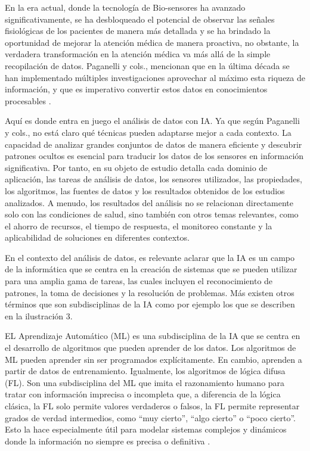 En la era actual, donde la tecnología de Bio-sensores ha avanzado significativamente, se ha desbloqueado el potencial de observar las señales fisiológicas de los pacientes de manera más detallada y se ha brindado la oportunidad de mejorar la atención médica de manera proactiva, no obstante, la verdadera transformación en la atención médica va más allá de la simple recopilación de datos. Paganelli y cols., mencionan que en la última década se han implementado múltiples investigaciones aprovechar al máximo esta riqueza de información, y que es imperativo convertir estos datos en conocimientos procesables \citep{Paganelli2022RealTime}.

Aquí es donde entra en juego el análisis de datos con IA. Ya que según Paganelli y cols., no está claro qué técnicas pueden adaptarse mejor a cada contexto. La capacidad de analizar grandes conjuntos de datos de manera eficiente y descubrir patrones ocultos es esencial para traducir los datos de los sensores en información significativa. Por tanto, en su objeto de estudio detalla cada dominio de aplicación, las tareas de análisis de datos, los sensores utilizados, las propiedades, los algoritmos, las fuentes de datos y los resultados obtenidos de los estudios analizados. A menudo, los resultados del análisis no se relacionan directamente solo con las condiciones de salud, sino también con otros temas relevantes, como el ahorro de recursos, el tiempo de respuesta, el monitoreo constante y la aplicabilidad de soluciones en diferentes contextos.

En el contexto del análisis de datos, es relevante aclarar que la IA es un campo de la informática que se centra en la creación de sistemas que se pueden utilizar para una amplia gama de tareas, las cuales incluyen el reconocimiento de patrones, la toma de decisiones y la resolución de problemas. Más existen otros términos que son subdisciplinas de la IA como por ejemplo los que se describen en la ilustración 3.

EL Aprendizaje Automático (ML) es una subdisciplina de la IA que se centra en el desarrollo de algoritmos que pueden aprender de los datos. Los algoritmos de ML pueden aprender sin ser programados explícitamente. En cambio, aprenden a partir de datos de entrenamiento. Igualmente, los algoritmos de lógica difusa (FL). Son una subdisciplina del ML que imita el razonamiento humano para tratar con información imprecisa o incompleta que, a diferencia de la lógica clásica, la FL solo permite valores verdaderos o falsos, la FL permite representar grados de verdad intermedios, como ``muy cierto'', ``algo cierto'' o ``poco cierto''. Esto la hace especialmente útil para modelar sistemas complejos y dinámicos donde la información no siempre es precisa o definitiva \citep{Kaur2022}.

